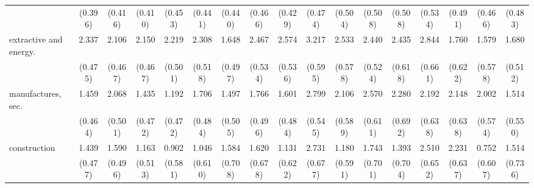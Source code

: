 {\begin{tabular}{l*{16}{c}}
                    &     (0.396)         &     (0.416)         &     (0.410)         &     (0.453)         &     (0.441)         &     (0.440)         &     (0.466)         &     (0.429)         &     (0.474)         &     (0.504)         &     (0.508)         &     (0.508)         &     (0.534)         &     (0.491)         &     (0.466)         &     (0.483)         \\
[1em]
extractive and energy.&       2.337\sym{***}&       2.106\sym{***}&       2.150\sym{***}&       2.219\sym{***}&       2.308\sym{***}&       1.648\sym{***}&       2.467\sym{***}&       2.574\sym{***}&       3.217\sym{***}&       2.533\sym{***}&       2.440\sym{***}&       2.435\sym{***}&       2.844\sym{***}&       1.760\sym{**} &       1.579\sym{**} &       1.680\sym{**} \\
                    &     (0.475)         &     (0.467)         &     (0.467)         &     (0.501)         &     (0.518)         &     (0.497)         &     (0.534)         &     (0.536)         &     (0.595)         &     (0.578)         &     (0.524)         &     (0.618)         &     (0.661)         &     (0.622)         &     (0.578)         &     (0.512)         \\
[1em]
manufactures, sec.  &       1.459\sym{**} &       2.068\sym{***}&       1.435\sym{**} &       1.192\sym{*}  &       1.706\sym{***}&       1.497\sym{**} &       1.766\sym{***}&       1.601\sym{***}&       2.799\sym{***}&       2.106\sym{***}&       2.570\sym{***}&       2.280\sym{***}&       2.192\sym{***}&       2.148\sym{***}&       2.002\sym{***}&       1.514\sym{**} \\
                    &     (0.464)         &     (0.501)         &     (0.472)         &     (0.472)         &     (0.484)         &     (0.505)         &     (0.496)         &     (0.484)         &     (0.545)         &     (0.589)         &     (0.611)         &     (0.692)         &     (0.638)         &     (0.638)         &     (0.574)         &     (0.550)         \\
[1em]
construction        &       1.439\sym{**} &       1.590\sym{**} &       1.163\sym{*}  &       0.902         &       1.046         &       1.584\sym{*}  &       1.620\sym{*}  &       1.131         &       2.731\sym{***}&       1.180\sym{*}  &       1.743\sym{*}  &       1.393\sym{*}  &       2.510\sym{***}&       2.231\sym{***}&       0.752         &       1.514\sym{*}  \\
                    &     (0.477)         &     (0.496)         &     (0.513)         &     (0.581)         &     (0.610)         &     (0.708)         &     (0.678)         &     (0.622)         &     (0.677)         &     (0.591)         &     (0.701)         &     (0.704)         &     (0.652)         &     (0.637)         &     (0.607)         &     (0.736)         \\

\end{tabular}}
